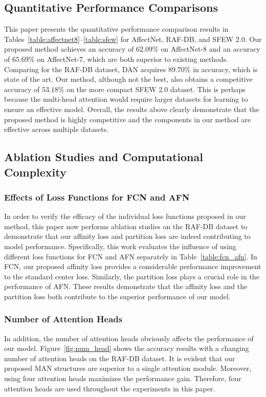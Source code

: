 \documentclass{article}
\begin{document}
\subsection{Quantitative Performance Comparisons}
This paper presents the quantitative performance comparison results in Tables~\ref{table:affectnet8}--\ref{table:sfew} for AffectNet, RAF-DB, and SFEW 2.0. Our proposed method achieves an accuracy of $62.09\%$ on AffectNet-8 and an accuracy of $65.69\%$ on AffectNet-7, which are both superior to existing methods. Comparing for the RAF-DB dataset, DAN acquires $89.70\%$ in accuracy, which is state of the art. Our method, although not the best, also obtains a competitive accuracy of $53.18\%$ on the more compact SFEW 2.0 dataset. This is perhaps because the multi-head attention would require larger datasets for learning to ensure an effective model. Overall, the results above clearly demonstrate that the proposed method is highly competitive and the components in our method are effective across multiple datasets.

\subsection{Ablation Studies and Computational Complexity}

\subsubsection{Effects of Loss Functions for FCN and AFN}
In order to verify the efficacy of the individual loss functions proposed in our method, this paper now performs ablation studies on the RAF-DB dataset to demonstrate that our affinity loss and partition loss are indeed contributing to model performance. Specifically, this work evaluates the influence of using different loss functions for FCN and AFN separately in Table~\ref{table:fcn_afn}. In FCN, our proposed affinity loss provides a considerable performance improvement to the standard center loss. Similarly, the partition loss plays a crucial role in the performance of AFN. These results demonstrate that the affinity loss and the partition loss both contribute to the superior performance of our model.


\subsubsection{Number of Attention Heads}
 In addition, the number of attention heads obviously affects the performance of our model. Figure~\ref{fig:num_head} shows the accuracy results with a changing number of attention heads on the RAF-DB dataset. It is evident that our proposed MAN structures are superior to a single attention module. Moreover, using four attention heads maximizes the performance gain. Therefore, four attention heads are used throughout the experiments in this paper.
\end{document}
